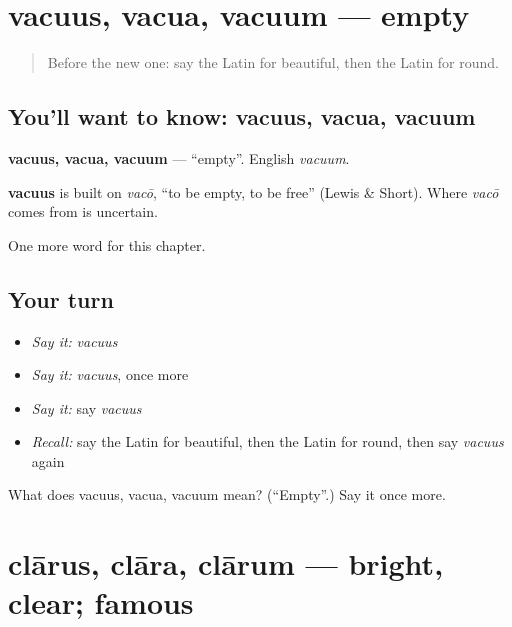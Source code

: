 \section[vacuus, vacua, vacuum]{vacuus, vacua, vacuum — empty}

\label{lesson:LA-C96-vacuus}



\begin{quote}
Before the new one: say the Latin for beautiful, then the Latin for round.
\end{quote}

\subsection*{You'll want to know: vacuus, vacua, vacuum}
\textbf{vacuus, vacua, vacuum} — \textquotedblleft{}empty\textquotedblright{}. English \emph{vacuum}.

\begin{cousinweb}
\textbf{vacuus} is built on \emph{vacō}, \textquotedblleft{}to be empty, to be free\textquotedblright{} (Lewis \& Short). Where \emph{vacō} comes from is uncertain.
\end{cousinweb}

\begin{grammarlens}[title={What you've built}]
One more word for this chapter.
\end{grammarlens}

\subsection*{Your turn}
\begin{itemize}
\raggedright
  \item \emph{Say it:} \emph{vacuus}
  \item \emph{Say it:} \emph{vacuus}, once more
  \item \emph{Say it:} say \emph{vacuus}
  \item \emph{Recall:} say the Latin for beautiful, then the Latin for round, then say \emph{vacuus} again
\end{itemize}

\begin{tcolorbox}[breakable,colback=teal!4,colframe=teal!35!black,title={Before you move on}]
What does vacuus, vacua, vacuum mean? (\textquotedblleft{}Empty\textquotedblright{}.) Say it once more.
\end{tcolorbox}
\section[clārus, clāra, clārum]{clārus, clāra, clārum — bright, clear; famous}

